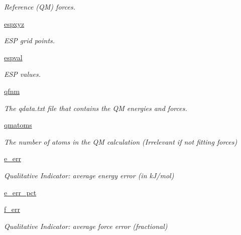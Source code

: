 \begin{DoxyCompactItemize}
\begin{DoxyCompactList}\small\item\em Reference (Q\-M) forces. \end{DoxyCompactList}\item 
\hyperlink{classforcebalance_1_1abinitio_1_1AbInitio_a8be2d088afb344036aae989ca3cbcc41}{espxyz}
\begin{DoxyCompactList}\small\item\em E\-S\-P grid points. \end{DoxyCompactList}\item 
\hyperlink{classforcebalance_1_1abinitio_1_1AbInitio_aba6d885086d455fce8c3d472fd08020d}{espval}
\begin{DoxyCompactList}\small\item\em E\-S\-P values. \end{DoxyCompactList}\item 
\hyperlink{classforcebalance_1_1abinitio_1_1AbInitio_ac93db408472034937e79572bf872886c}{qfnm}
\begin{DoxyCompactList}\small\item\em The qdata.\-txt file that contains the Q\-M energies and forces. \end{DoxyCompactList}\item 
\hyperlink{classforcebalance_1_1abinitio_1_1AbInitio_af0760b8d33ce9dd044ccbe68fba7a1be}{qmatoms}
\begin{DoxyCompactList}\small\item\em The number of atoms in the Q\-M calculation (Irrelevant if not fitting forces) \end{DoxyCompactList}\item 
\hyperlink{classforcebalance_1_1abinitio_1_1AbInitio_aa569290969858e189935b3de37ead3f0}{e\-\_\-err}
\begin{DoxyCompactList}\small\item\em Qualitative Indicator\-: average energy error (in k\-J/mol) \end{DoxyCompactList}\item 
\hyperlink{classforcebalance_1_1abinitio_1_1AbInitio_a4e3e525a03ab55bc004ebf0e3a0d60ce}{e\-\_\-err\-\_\-pct}
\item 
\hyperlink{classforcebalance_1_1abinitio_1_1AbInitio_a176fb2b013ecc5ab451fd3b190414c4d}{f\-\_\-err}
\begin{DoxyCompactList}\small\item\em Qualitative Indicator\-: average force error (fractional) \end{DoxyCompactList}\item 

\end{DoxyCompactItemize}
